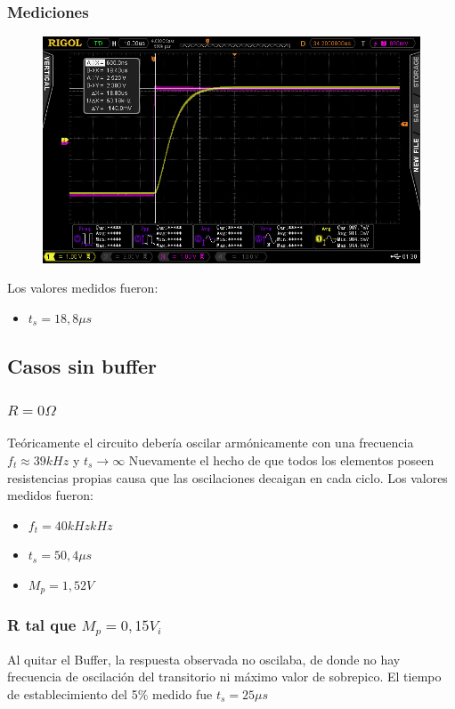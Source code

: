 \subsubsection{Mediciones}

\begin{figure}[H]
  \centering
  \includegraphics[width=\textwidth]{Mediciones_pendrive_alan/Newfile2.jpeg}  
\end{figure}

Los valores medidos fueron:
\begin{itemize}
  \item $t_s= 18,8 \mu s$
\end{itemize}

\subsection{Casos sin buffer}
\subsubsection{$R=0\Omega$}
Teóricamente el circuito debería oscilar armónicamente con una frecuencia $f_t\approx39 kHz$ y $t_s\rightarrow\infty$
Nuevamente el hecho de que todos los elementos poseen resistencias propias causa que las oscilaciones decaigan en cada ciclo. Los valores medidos fueron:
\begin{itemize}
  \item $f_t= 40 kHz kHz$
  \item $t_s=50,4\mu s$
  \item $M_p=1,52 V$
\end{itemize}

\subsubsection{R tal que $M_p=0,15V_i$}
Al quitar el Buffer, la respuesta observada no oscilaba, de donde no hay frecuencia de oscilación del transitorio ni máximo valor de sobrepico. El tiempo de establecimiento del 5\% medido fue $t_s=25\mu s$


